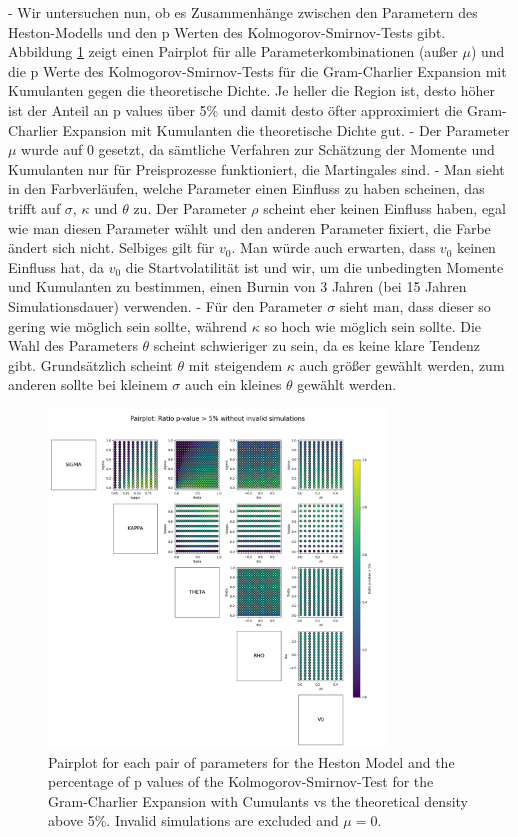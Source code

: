 - Wir untersuchen nun, ob es Zusammenhänge zwischen den Parametern des Heston-Modells und den p Werten des Kolmogorov-Smirnov-Tests gibt. Abbildung \ref{fig:pairplot_GC_cum_KS_muzero} zeigt einen Pairplot für alle Parameterkombinationen (außer $\mu$) und die p Werte des Kolmogorov-Smirnov-Tests für die Gram-Charlier Expansion
mit Kumulanten gegen die theoretische Dichte. Je heller die Region ist, desto höher ist der Anteil an p values über 5\% und damit desto öfter approximiert die Gram-Charlier Expansion mit Kumulanten die theoretische Dichte gut.
- Der Parameter $\mu$ wurde auf 0 gesetzt, da sämtliche Verfahren zur Schätzung der Momente und Kumulanten nur für Preisprozesse funktioniert, die Martingales sind. 
- Man sieht in den Farbverläufen, welche Parameter einen Einfluss zu haben scheinen, das trifft auf $\sigma$, $\kappa$ und $\theta$ zu. Der Parameter $\rho$ scheint eher keinen Einfluss haben, egal wie man diesen Parameter wählt und den anderen Parameter fixiert, die Farbe ändert sich nicht. Selbiges gilt für $v_0$. Man würde auch erwarten, dass $v_0$ keinen Einfluss hat, da $v_0$ die Startvolatilität ist und wir, um die unbedingten Momente und Kumulanten zu bestimmen, einen Burnin von 3 Jahren (bei 15 Jahren Simulationsdauer) verwenden. 
- Für den Parameter $\sigma$ sieht man, dass dieser so gering wie möglich sein sollte, während $\kappa$ so hoch wie möglich sein sollte. Die Wahl des Parameters $\theta$ scheint schwieriger zu sein, da es keine klare Tendenz gibt. Grundsätzlich scheint $\theta$ mit steigendem $\kappa$ auch größer gewählt werden, zum anderen sollte bei kleinem $\sigma$ auch ein kleines $\theta$ gewählt werden.
\begin{figure}
    \centering
    \includegraphics[width=0.8\textwidth]{img/pairplot_GC_cum_KS_muzero.png}
    \caption{Pairplot for each pair of parameters for the Heston Model and the percentage of p values of the Kolmogorov-Smirnov-Test for the Gram-Charlier Expansion with Cumulants vs the theoretical density above 5\%. Invalid simulations are excluded and $\mu=0$.}
    \label{fig:pairplot_GC_cum_KS_muzero}
\end{figure}

